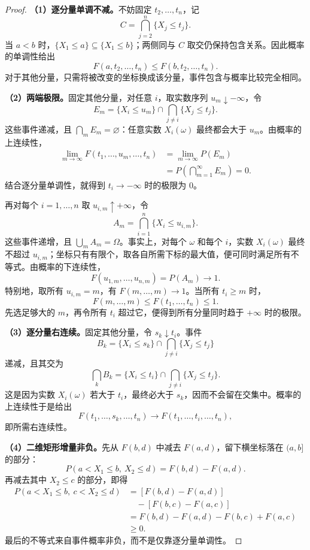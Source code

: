 \begin{proof}

\textbf{（1）逐分量单调不减。}\quad 不妨固定 $t_2,\ldots,t_n$，记
\[
C=\bigcap_{j=2}^n\{X_j\leq t_j\}.
\]
当 $a<b$ 时，$\{X_1\leq a\}\subseteq\{X_1\leq b\}$；两侧同与 $C$ 取交仍保持包含关系。因此概率的单调性给出
\[
F(a,t_2,\ldots,t_n)\leq F(b,t_2,\ldots,t_n).
\]
对于其他分量，只需将被改变的坐标换成该分量，事件包含与概率比较完全相同。

\textbf{（2）两端极限。}\quad 固定其他分量，对任意 $i$，取实数序列 $u_m\downarrow-\infty$，令
\[
E_m=\{X_i\leq u_m\}\cap\bigcap_{j\ne i}\{X_j\leq t_j\}.
\]
这些事件递减，且 $\bigcap_mE_m=\varnothing$：任意实数 $X_i(\omega)$ 最终都会大于 $u_m$。由概率的上连续性，
\begin{align*}
\lim_{m\to\infty}F(t_1,\ldots,u_m,\ldots,t_n)
&=\lim_{m\to\infty}P(E_m)\\
&=P\left(\bigcap_{m=1}^{\infty}E_m\right)
=0.
\end{align*}
结合逐分量单调性，就得到 $t_i\to-\infty$ 时的极限为 $0$。

再对每个 $i=1,\ldots,n$ 取 $u_{i,m}\uparrow+\infty$，令
\[
A_m=\bigcap_{i=1}^n\{X_i\leq u_{i,m}\}.
\]
这些事件递增，且 $\bigcup_m A_m=\Omega$。事实上，对每个 $\omega$ 和每个 $i$，实数 $X_i(\omega)$ 最终不超过 $u_{i,m}$；坐标只有有限个，取各自所需下标的最大值，便可同时满足所有不等式。由概率的下连续性，
\[
F(u_{1,m},\ldots,u_{n,m})=P(A_m)\longrightarrow1.
\]
特别地，取所有 $u_{i,m}=m$，有 $F(m,\ldots,m)\to1$。当所有 $t_i\geq m$ 时，
\[
F(m,\ldots,m)\leq F(t_1,\ldots,t_n)\leq1.
\]
先选足够大的 $m$，再令所有 $t_i$ 超过它，便得到所有分量同时趋于 $+\infty$ 时的极限。

\textbf{（3）逐分量右连续。}\quad 固定其他分量，令 $s_k\downarrow t_i$。事件
\[
B_k=\{X_i\leq s_k\}\cap\bigcap_{j\ne i}\{X_j\leq t_j\}
\]
递减，且其交为
\[
\bigcap_kB_k=\{X_i\leq t_i\}\cap\bigcap_{j\ne i}\{X_j\leq t_j\}.
\]
这是因为实数 $X_i(\omega)$ 若大于 $t_i$，最终必大于 $s_k$，因而不会留在交集中。概率的上连续性于是给出
\[
F(t_1,\ldots,s_k,\ldots,t_n)
\longrightarrow F(t_1,\ldots,t_i,\ldots,t_n),
\]
即所需右连续性。

\textbf{（4）二维矩形增量非负。}\quad 先从 $F(b,d)$ 中减去 $F(a,d)$，留下横坐标落在 $(a,b]$ 的部分：
\[
P(a<X_1\leq b,\ X_2\leq d)=F(b,d)-F(a,d).
\]
再减去其中 $X_2\leq c$ 的部分，即得
\begin{align*}
P(a<X_1\leq b,\ c<X_2\leq d)
&=[F(b,d)-F(a,d)]\\
&\quad-[F(b,c)-F(a,c)]\\
&=F(b,d)-F(a,d)-F(b,c)+F(a,c)\\
&\geq0.
\end{align*}
最后的不等式来自事件概率非负，而不是仅靠逐分量单调性。
\end{proof}

